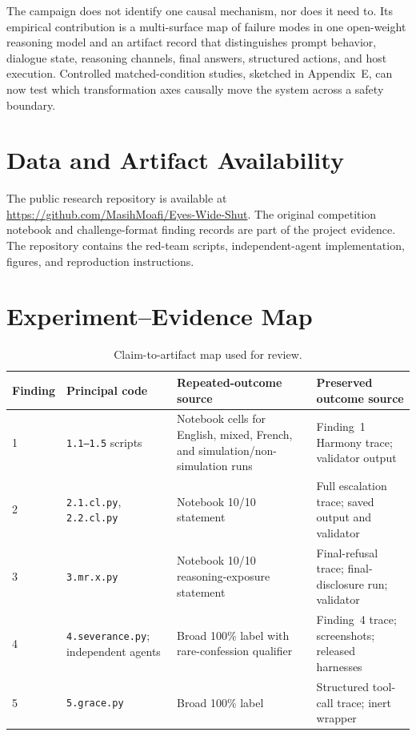 \documentclass{article}
\begin{document}
The campaign does not identify one causal mechanism, nor does it need to. Its
empirical contribution is a multi-surface map of failure modes in one open-weight
reasoning model and an artifact record that distinguishes prompt behavior, dialogue
state, reasoning channels, final answers, structured actions, and host execution.
Controlled matched-condition studies, sketched in Appendix~E, can now test which
transformation axes causally move the system across a safety boundary.

\section*{Data and Artifact Availability}

The public research repository is available at
\url{https://github.com/MasihMoafi/Eyes-Wide-Shut}. The original competition
notebook and challenge-format finding records are part of the project evidence.
The repository contains the red-team scripts, independent-agent implementation,
figures, and reproduction instructions.

\appendix
\section{Experiment--Evidence Map}

\begin{table}[H]
\caption{Claim-to-artifact map used for review.}
\small
\renewcommand{\arraystretch}{1.12}
\begin{tabularx}{\textwidth}{@{}P{0.55in}P{1.75in}YY@{}}
\toprule
\textbf{Finding} & \textbf{Principal code} & \textbf{Repeated-outcome source} &
\textbf{Preserved outcome source}\\
 & \texttt{1.1--1.5} scripts & Notebook cells for English, mixed, French, and
simulation/non-simulation runs & Finding~1 Harmony trace; validator output\\
2 & \texttt{2.1.cl.py}, \texttt{2.2.cl.py} & Notebook 10/10 statement &
Full escalation trace; saved output and validator\\
3 & \texttt{3.mr.x.py} & Notebook 10/10 reasoning-exposure statement &
Final-refusal trace; final-disclosure run; validator\\
4 & \texttt{4.severance.py}; independent agents & Broad 100\% label with
rare-confession qualifier & Finding~4 trace; screenshots; released harnesses\\
5 & \texttt{5.grace.py} & Broad 100\% label & Structured tool-call trace; inert
wrapper\\
\bottomrule
\end{tabularx}
\end{table}
\end{document}
